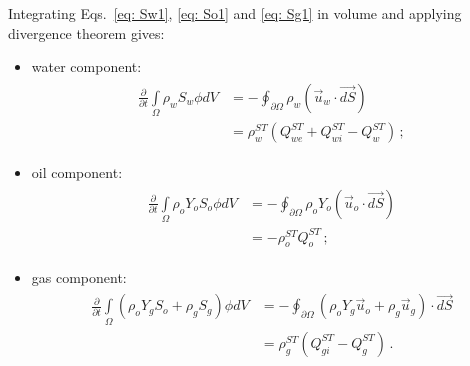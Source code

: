 \documentclass[final,authoryear,5p,twocolumn,10pt]{elsarticle}
\begin{document}
Integrating Eqs.~\eqref{eq: Sw1}, \eqref{eq: So1} and \eqref{eq: Sg1} in volume and applying divergence theorem gives:
\begin{itemize}
\item water component:
\begin{align}\label{eq: Sw2}
\begin{split}
\frac{\partial}{\partial t} \int\limits_{\Omega} \rho_w S_w \phi dV &= - \oint_{\partial \Omega} \rho_w \left( \vec{u}_w \cdot \vec{dS} \right) \\
&= \rho_w^{ST}\left(Q_{we}^{ST} + Q_{wi}^{ST}-Q_w^{ST}\right) \, ;
\end{split}
\end{align}

\item oil component:
\begin{align}\label{eq: So2}
\begin{split}
\frac{\partial}{\partial t} \int\limits_{\Omega} \rho_o Y_o S_o \phi dV &= -\oint_{\partial \Omega} \rho_o Y_o \left(\vec{u}_o \cdot \vec{dS} \right) \\
&= - \rho_o^{ST}Q_o^{ST} \, ;
\end{split}
\end{align}

\item gas component:
\begin{align}\label{eq: Sg2}
\begin{split}
\frac{\partial}{\partial t} \int\limits_{\Omega} \left( \rho_o Y_g S_o + \rho_g S_g\right) \phi dV &= - \oint_{\partial \Omega} \left( \rho_o Y_g \vec{u}_o + \rho_g \vec{u}_g\right) \cdot \vec{dS} \\
&=  \rho_g^{ST}(Q_{gi}^{ST}-Q_g^{ST}) \, .
\end{split}
\end{align}
\end{itemize}
%
%
%
%
\end{document}
